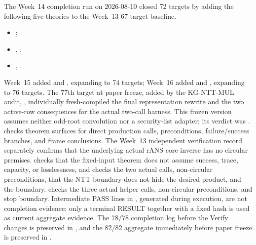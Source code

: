 \begin{boundary}
The Week~14 completion run on 2026-08-10 closed 72 targets by adding the following
five theories to the Week~13 67-target baseline.
\begin{itemize}[leftmargin=1.5em,itemsep=0.05em,topsep=0.25em]
  \raggedright
  \item {}\allowbreak{};
  \item {},
        ;
  \item {},
        \allowbreak{}.
\end{itemize}
Week~15 added  and
, expanding to 74 targets; Week~16
added  and
, expanding to 76 targets.
The 77th target at paper freeze, added by the KG-NTT-MUL audit,
\allowbreak{}, individually
fresh-compiled the final  representation rewrite and the
two active-row consequences for the actual two-call harness. This frozen version
assumes neither odd-root convolution nor a security-list adapter; its verdict was
.
\allowbreak
{} checks theorem surfaces for direct production calls,
preconditions, failure/success branches, and frame conclusions. The Week~13
independent verification record separately confirms that the underlying actual
rANS core inverse has no circular premises.
\allowbreak
{} checks that the fixed-input theorem does not
assume success, trace, capacity, or losslessness, and
\allowbreak
{} checks the two actual calls, non-circular
preconditions, that the NTT boundary does not hide the desired product, and the
 boundary.
 checks the three actual helper
calls, non-circular preconditions, and stop boundary. Intermediate PASS lines in
, generated during execution, are not
completion evidence; only a terminal RESULT together with a fixed hash is used
as current aggregate evidence. The 78/78 completion log before the Verify changes
is preserved in , and the
82/82 aggregate immediately before paper freeze is preserved in
.


\end{boundary}
